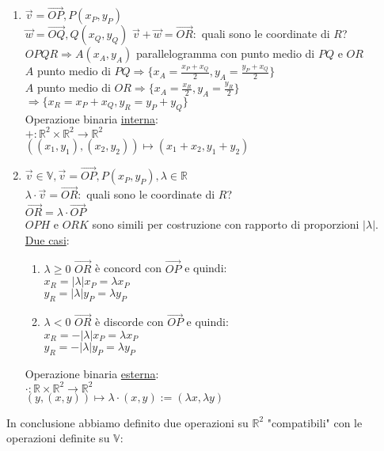 \documentclass{article}
\newcommand{\ul}[1]{\underline{#1}}
\newcommand{\R}{\mathbb{R}}
\newcommand{\V}{\mathbb{V}}
\begin{document}
\begin{enumerate}
	\item $\vec{v}=\vec{OP},P(x_P,y_P)$\\
	      $\vec{w}=\vec{OQ},Q(x_Q,y_Q)$
	      $\vec{v}+\vec{w}=\vec{OR}:$ quali sono le coordinate di $R$?\\
	      $OPQR\Rightarrow A(x_A,y_A)$ parallelogramma con punto medio di $PQ$ e $OR$\\
	      $A$ punto medio di $PQ\Rightarrow\{x_A=\frac{x_P+x_Q}{2},y_A=\frac{y_P+x_Q}{2}\}$\\
	      $A$ punto medio di $OR\Rightarrow\{x_A=\frac{x_R}{2},y_A=\frac{y_R}{2}\}$\\
	      $\Rightarrow\{x_R=x_P+x_Q,y_R=y_P+y_Q\}$\\
	      Operazione binaria \ul{interna}:\\
	      $+:\R^2\times\R^2\rightarrow\R^2$\\
	      $((x_1,y_1),(x_2,y_2))\mapsto(x_1+x_2,y_1+y_2)$
	\item $\vec{v}\in\V,\vec{v}=\vec{OP},P(x_P,y_P),\lambda\in\R$\\
	      $\lambda\cdot\vec{v}=\vec{OR}:$ quali sono le coordinate di $R$?\\
	      $\vec{OR}=\lambda\cdot\vec{OP}$\\
	      $OPH$ e $ORK$ sono simili per costruzione con rapporto di proporzioni $|\lambda|$.\\
	      \ul{Due casi}:
	      \begin{enumerate}
		      \item $\lambda\ge0$ $\vec{OR}$ è concord con $\vec{OP}$ e quindi:\\
		            $x_R=|\lambda|x_P=\lambda x_P$\\
		            $y_R=|\lambda|y_P=\lambda y_P$
		      \item $\lambda<0$ $\vec{OR}$ è discorde con $\vec{OP}$ e quindi:\\
		            $x_R=-|\lambda|x_P=\lambda x_P$\\
		            $y_R=-|\lambda|y_P=\lambda y_P$
	      \end{enumerate}
	      Operazione binaria \ul{esterna}:\\
	      $\cdot:\R\times\R^2\rightarrow\R^2$\\
	      \hspace*{0.1em}$(y,(x,y))\mapsto\lambda\cdot(x,y):=(\lambda x,\lambda y)$
\end{enumerate}
In conclusione abbiamo definito due operazioni su $\R^2$ "compatibili" con le operazioni definite su $\V$:
\end{document}
